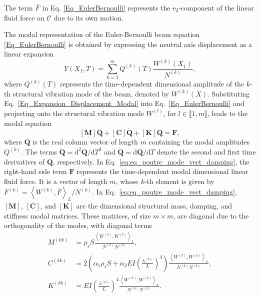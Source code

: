The term $\overline{F_{}}$ in Eq. \eqref{Eq_EulerBernoulli} represents the $\boldsymbol{\mathrm{e}}_{2}$-component of the linear fluid force on $\mathcal{C}_{}$ due to its own motion.

The modal representation of the Euler-Bernoulli beam equation \eqref{Eq_EulerBernoulli} is obtained by expressing the neutral axis displacement as a linear expansion
\begin{equation}\label{Eq_Expansion_Displacement_Modal}
Y\left(X_1,T\right) = \sum_{k=1}^{m} Q^{(k)}(T) \frac{W^{(k)}(X_1)}{N^{(k)}},
\end{equation}
where \( Q^{(k)}(T) \) represents the time-dependent dimensional amplitude of the \( k \)-th structural vibration mode of the beam, denoted by \( W^{(k)}(X) \).
Substituting Eq.~\eqref{Eq_Expansion_Displacement_Modal} into Eq.~\eqref{Eq_EulerBernoulli} and projecting onto the structural vibration mode \( W^{(l)} \), for \( l \in \llbracket 1,m\rrbracket \), leads to the modal equation
\begin{equation}
\label{eq:eq_poutre_mode_vect_damping}
[\mathbf{M}] \ddot{\mathbf{Q}} + [\mathbf{C}] \dot{\mathbf{Q}} + [\mathbf{K}] {\mathbf{Q}} = {\mathbf{F}},
\end{equation}
where \(\mathbf{Q}\) is the real column vector of length \(m\) containing the modal amplitudes \( Q^{(k)} \). The terms \(\ddot{\mathbf{Q}} = {\textrm{d}}^2{\mathbf{Q}}/{\textrm{d}}T^2\) and \(\dot{\mathbf{Q}} = {\textrm{d}}{\mathbf{Q}}/{\textrm{d}}T\) denote the second and first time derivatives of \(\mathbf{Q}\), respectively.
In Eq.~\eqref{eq:eq_poutre_mode_vect_damping}, the right-hand side term \({\mathbf{F}}\) represents the time-dependent modal dimensional linear fluid force. It is a vector of length \(m\), whose \(k\)-th element is given by  
$F^{(k)} = \left\langle W^{(k)},\overline{F} \right\rangle_{L}/N^{(k)}$. In Eq.~\eqref{eq:eq_poutre_mode_vect_damping}, $[\mathbf{M}]$, $[\mathbf{C}]$, and $[\mathbf{K}]$ are the dimensional structural mass, damping, and stiffness modal matrices. These matrices, of size $m\times m$, are diagonal due to the orthogonality of the modes, with diagonal terms 
\begin{subequations}
\begin{align}
         M^{(kk)} &= \rho_s S \frac{\left\langle W_{}^{(k)},W_{}^{(k)}\right\rangle_{L}}{N_{}^{(k)}N_{}^{(k)}},\\
         C^{(kk)} &= 2 \left(\alpha_1 \rho_s S + \alpha_2 EI \left(\frac{\lambda^{(k)}}{L}\right)^4\right)\frac{\left\langle W_{}^{(k)},W_{}^{(k)}\right\rangle_{L}}{N_{}^{(k)}N_{}^{(k)}},\\
         K^{(kk)} &= EI \left(\frac{\lambda^{(k)}}{L}\right)^4 \frac{\left\langle W_{}^{(k)},W_{}^{(k)}\right\rangle_{L}}{N_{}^{(k)}N_{}^{(k)}}.
\end{align}
\end{subequations}
